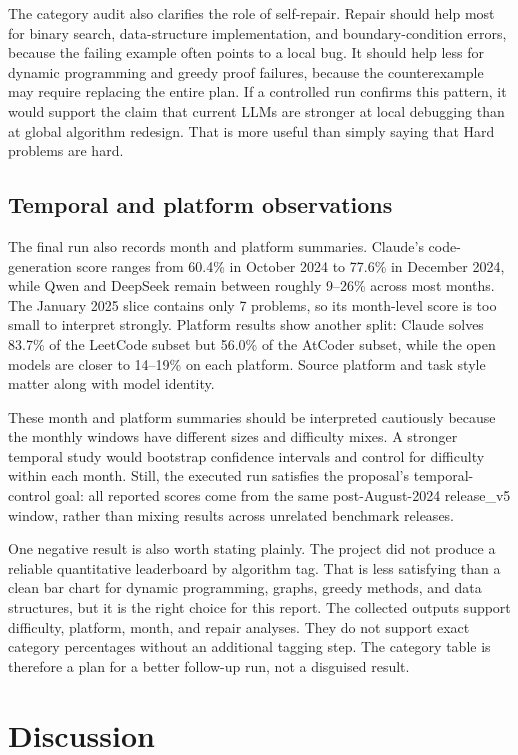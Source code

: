\documentclass[11pt]{article}
\begin{document}
The category audit also clarifies the role of self-repair. Repair should help most for binary search, data-structure implementation, and boundary-condition errors, because the failing example often points to a local bug. It should help less for dynamic programming and greedy proof failures, because the counterexample may require replacing the entire plan. If a controlled run confirms this pattern, it would support the claim that current LLMs are stronger at local debugging than at global algorithm redesign. That is more useful than simply saying that Hard problems are hard.

\subsection{Temporal and platform observations}
The final run also records month and platform summaries. Claude's code-generation score ranges from 60.4\% in October 2024 to 77.6\% in December 2024, while Qwen and DeepSeek remain between roughly 9--26\% across most months. The January 2025 slice contains only 7 problems, so its month-level score is too small to interpret strongly. Platform results show another split: Claude solves 83.7\% of the LeetCode subset but 56.0\% of the AtCoder subset, while the open models are closer to 14--19\% on each platform. Source platform and task style matter along with model identity.

These month and platform summaries should be interpreted cautiously because the monthly windows have different sizes and difficulty mixes. A stronger temporal study would bootstrap confidence intervals and control for difficulty within each month. Still, the executed run satisfies the proposal's temporal-control goal: all reported scores come from the same post-August-2024 release\_v5 window, rather than mixing results across unrelated benchmark releases.

One negative result is also worth stating plainly. The project did not produce a reliable quantitative leaderboard by algorithm tag. That is less satisfying than a clean bar chart for dynamic programming, graphs, greedy methods, and data structures, but it is the right choice for this report. The collected outputs support difficulty, platform, month, and repair analyses. They do not support exact category percentages without an additional tagging step. The category table is therefore a plan for a better follow-up run, not a disguised result.

\section{Discussion}
\end{document}
